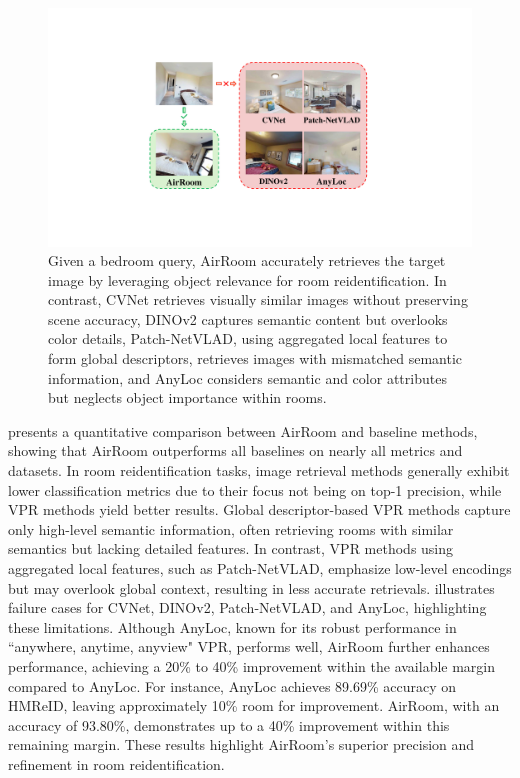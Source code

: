 \begin{figure}[ht]
    \centering
    \includegraphics[width=\columnwidth]{failure_font.pdf}
    \vspace{-16pt}
    \caption{Given a bedroom query, AirRoom accurately retrieves the target image by leveraging object relevance for room reidentification. In contrast, CVNet retrieves visually similar images without preserving scene accuracy, DINOv2 captures semantic content but overlooks color details, Patch-NetVLAD, using aggregated local features to form global descriptors, retrieves images with mismatched semantic information, and AnyLoc considers semantic and color attributes but neglects object importance within rooms.}
    \vspace{-5pt}
    \label{fig:failure}
\end{figure}

 presents a quantitative comparison between AirRoom and baseline methods, showing that AirRoom outperforms all baselines on nearly all metrics and datasets. In room reidentification tasks, image retrieval methods generally exhibit lower classification metrics due to their focus not being on top-1 precision, while VPR methods yield better results. Global descriptor-based VPR methods capture only high-level semantic information, often retrieving rooms with similar semantics but lacking detailed features. In contrast, VPR methods using aggregated local features, such as Patch-NetVLAD, emphasize low-level encodings but may overlook global context, resulting in less accurate retrievals.  illustrates failure cases for CVNet, DINOv2, Patch-NetVLAD, and AnyLoc, highlighting these limitations. 
Although AnyLoc, known for its robust performance in ``anywhere, anytime, anyview" VPR, performs well, AirRoom further enhances performance, achieving a 20\% to 40\% improvement within the available margin compared to AnyLoc. For instance, AnyLoc achieves 89.69\% accuracy on HMReID, leaving approximately 10\% room for improvement. AirRoom, with an accuracy of 93.80\%, demonstrates up to a 40\% improvement within this remaining margin. These results highlight AirRoom's superior precision and refinement in room reidentification.

